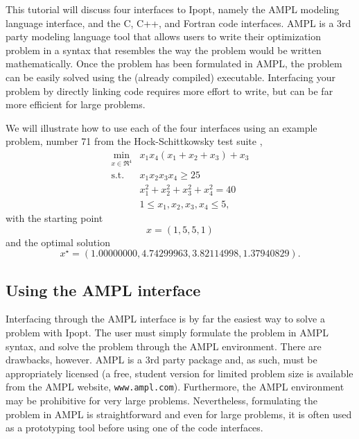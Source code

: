 \documentclass[letter,10pt]{article}
\newcommand{\Ipopt}{{\sc Ipopt}}
\begin{document}
This tutorial will discuss four interfaces to \Ipopt, namely the AMPL
modeling language interface, and the C, C++, and Fortran code
interfaces.  AMPL is a 3rd party modeling language tool that allows
users to write their optimization problem in a syntax that resembles
the way the problem would be written mathematically. Once the problem
has been formulated in AMPL, the problem can be easily solved using
the (already compiled) executable. Interfacing your problem by
directly linking code requires more effort to write, but can be far
more efficient for large problems.

We will illustrate how to use each of the four interfaces using an
example problem, number 71 from the Hock-Schittkowsky test suite \cite{HS},
  \begin{eqnarray}
    \min_{x \in \Re^4} &x_1 x_4 (x_1 + x_2 + x_3)  +  x_3 \label{eq:ex_obj} \\
    \mbox{s.t.} \;  &x_1 x_2 x_3 x_4 \ge 25 \label{eq:ex_ineq} \\
    &x_1^2 + x_2^2 + x_3^2 + x_4^2  =  40 \label{eq:ex_equ} \\
    &1 \leq x_1, x_2, x_3, x_4 \leq 5, \label{eq:ex_bounds}
  \end{eqnarray}
with the starting point
\begin{equation}
x {=} (1, 5, 5, 1) \label{eq:ex_startpt}
\end{equation}
and the optimal solution
\[
x^\star {=} (1.00000000, 4.74299963, 3.82114998, 1.37940829). \nonumber
\]

\subsection{Using the AMPL interface}
Interfacing through the AMPL interface is by far the easiest way to
solve a problem with \Ipopt. The user must simply formulate the problem
in AMPL syntax, and solve the problem through the AMPL environment.
There are drawbacks, however. AMPL is a 3rd party package and, as
such, must be appropriately licensed (a free, student version for
limited problem size is available from the AMPL website,
\texttt{www.ampl.com}). Furthermore, the AMPL environment may be prohibitive
for very large problems. Nevertheless, formulating the problem in AMPL
is straightforward and even for large problems, it is often used as a
prototyping tool before using one of the code interfaces.
\end{document}
